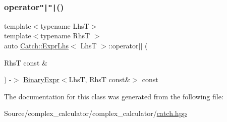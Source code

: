 \subsubsection{\texorpdfstring{operator\texttt{"|}\texttt{"|}()}{operator||()}}
{\footnotesize\ttfamily template$<$typename LhsT$>$ \\
template$<$typename RhsT $>$ \\
auto \mbox{\hyperlink{class_catch_1_1_expr_lhs}{Catch\+::\+Expr\+Lhs}}$<$ LhsT $>$\+::operator$\vert$$\vert$ (\begin{DoxyParamCaption}\item[{RhsT const \&}]{ }\end{DoxyParamCaption}) -\/$>$ \mbox{\hyperlink{class_catch_1_1_binary_expr}{Binary\+Expr}}$<$LhsT, RhsT const\&$>$ const \hspace{0.3cm}{\ttfamily [inline]}}



The documentation for this class was generated from the following file\+:\begin{DoxyCompactItemize}
\item 
Source/complex\+\_\+calculator/complex\+\_\+calculator/\mbox{\hyperlink{catch_8hpp}{catch.\+hpp}}\end{DoxyCompactItemize}
